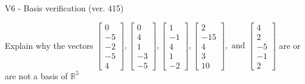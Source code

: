 \begin{exercise}
  \begin{exerciseTitle}V6 - Basis verification (ver. 415)\end{exerciseTitle}
  \begin{exerciseStatement}
    Explain why the vectors \(\left[\begin{array}{r}
0 \\
-5 \\
-2 \\
-5 \\
4
\end{array}\right] , \left[\begin{array}{r}
0 \\
4 \\
1 \\
-3 \\
-5
\end{array}\right] , \left[\begin{array}{r}
1 \\
-1 \\
4 \\
1 \\
-2
\end{array}\right] , \left[\begin{array}{r}
2 \\
-15 \\
4 \\
3 \\
10
\end{array}\right] , \text{ and } \left[\begin{array}{r}
4 \\
2 \\
-5 \\
-1 \\
2
\end{array}\right]\) are or are not a basis of \(\mathbb{R}^5\)	



\end{exerciseStatement}
\end{exercise}
